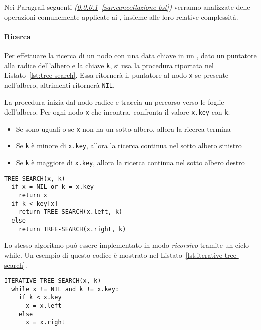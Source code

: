 \documentclass[italian, 10pt]{article}
\begin{document}
Nei Paragrafi seguenti \textit{(\ref{par:ricerca-bst}~\ref{par:cancellazione-bst})} verranno analizzate delle operazioni comunemente applicate ai \BST, insieme alle loro relative complessità.

\paragraph{Ricerca}
\label{par:ricerca-bst}

Per effettuare la ricerca di un nodo con una data chiave in un \BST, dato un puntatore alla radice dell'albero e la chiave \texttt{k}, si usa la procedura riportata nel Listato~\ref{lst:tree-search}.
Essa ritornerà il puntatore al nodo \texttt{x} se presente nell'albero, altrimenti ritornerà \texttt{NIL}.

La procedura inizia dal nodo radice e traccia un percorso verso le foglie dell'albero.
Per ogni nodo \texttt{x} che incontra, confronta il valore \texttt{x.key} con \texttt{k}:

\begin{itemize}
  \item Se sono uguali o se \texttt{x} non ha un sotto albero, allora la ricerca termina
  \item Se \texttt{k} è minore di \texttt{x.key}, allora la ricerca continua nel sotto albero sinistro
  \item Se \texttt{k} è maggiore di \texttt{x.key}, allora la ricerca continua nel sotto albero destro
\end{itemize}

\begin{lstlisting}[style=pseudocode, caption={Ricerca di un nodo in un \BST}, label={lst:tree-search}]
TREE-SEARCH(x, k)
  if x = NIL or k = x.key
    return x
  if k < key[x]
    return TREE-SEARCH(x.left, k)
  else
    return TREE-SEARCH(x.right, k)
\end{lstlisting}

\bigskip
Lo stesso algoritmo può essere implementato in modo \textit{ricorsivo} tramite un ciclo while.
Un esempio di questo codice è mostrato nel Listato~\ref{lst:iterative-tree-search}.

\begin{lstlisting}[style=pseudocode, caption={Ricerca iterativa di un nodo in un BST}, label={lst:iterative-tree-search}]
ITERATIVE-TREE-SEARCH(x, k)
  while x != NIL and k != x.key:
    if k < x.key
      x = x.left
    else
      x = x.right
\end{lstlisting}
\end{document}
